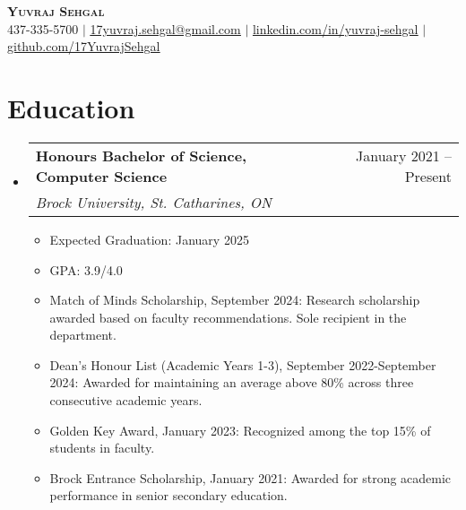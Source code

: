 \documentclass[letterpaper,11pt]{article}
\makeatletter
\newcommand{\resumeItem}[1]{
  \item\small{
    {#1 \vspace{-2pt}}
  }
}
\newcommand{\resumeSubheading}[4]{
  \vspace{-2pt}\item
    \begin{tabular*}{0.97\textwidth}[t]{l@{\extracolsep{\fill}}r}
      \textbf{#1} & #2 \\
      \textit{\small#3} & \textit{\small #4} \\
    \end{tabular*}\vspace{-7pt}
}
\newcommand{\resumeSubHeadingListStart}{\begin{itemize}[leftmargin=0.15in, label={}]}
\newcommand{\resumeSubHeadingListEnd}{\end{itemize}}
\newcommand{\resumeItemListStart}{\begin{itemize}}
\newcommand{\resumeItemListEnd}{\end{itemize}\vspace{-5pt}}
\makeatother
\begin{document}
\begin{center}
    \textbf{\Large \scshape Yuvraj Sehgal}\\
    \small 437-335-5700 $|$ 
    \href{mailto:17yuvraj.sehgal@gmail.com}{\underline{17yuvraj.sehgal@gmail.com}} $|$ \href{https://ca.linkedin.com/in/yuvraj-sehgal}{\underline{linkedin.com/in/yuvraj-sehgal}} $|$ \href{https://github.com/17YuvrajSehgal}{\underline{github.com/17YuvrajSehgal}}
\end{center}

\section{Education}
\resumeSubHeadingListStart
  \resumeSubheading
    {Honours Bachelor of Science, Computer Science}{January 2021 -- Present}
    {Brock University, St. Catharines, ON}{}
    \resumeItemListStart
      \resumeItem{Expected Graduation:}{January 2025}
      \resumeItem{GPA:}{3.9/4.0}
      \resumeItem{Match of Minds Scholarship, September 2024:}{Research scholarship awarded based on faculty recommendations. Sole recipient in the department.}
      \resumeItem{Dean's Honour List (Academic Years 1-3), September 2022-September 2024:}{Awarded for maintaining an average above 80\% across three consecutive academic years.}
      \resumeItem{Golden Key Award, January 2023:}{Recognized among the top 15\% of students in faculty.}
      \resumeItem{Brock Entrance Scholarship, January 2021:}{Awarded for strong academic performance in senior secondary education.}
    \resumeItemListEnd
\resumeSubHeadingListEnd




\end{document}
